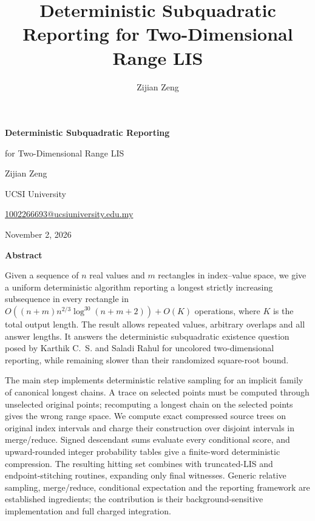 \documentclass[acmsmall,11pt,nonacm,natbib=false]{acmart}
\title[Deterministic Two-Dimensional Range LIS]{Deterministic Subquadratic Reporting for Two-Dimensional Range LIS}
\author{Zijian Zeng}
\affiliation{\institution{UCSI University}\country{Malaysia}}
\begin{document}
\pagestyle{research}
\begingroup\thispagestyle{empty}
\centering
\vspace*{0.7in}
{\LARGE\bfseries Deterministic Subquadratic Reporting\par
for Two-Dimensional Range LIS\par}
\vspace{0.35in}
{\large Zijian Zeng\par}
\vspace{0.1in}
UCSI University\par
\href{mailto:1002266693@ucsiuniversity.edu.my}{1002266693@ucsiuniversity.edu.my}\par
\vspace{0.2in}
November 2, 2026\par
\vspace{0.45in}
\begin{minipage}{\textwidth}
\begin{center}\textbf{Abstract}\end{center}
Given a sequence of $n$ real values and $m$ rectangles in index--value space,
we give a uniform deterministic algorithm reporting a longest strictly
increasing subsequence in every rectangle in
$O((n+m)n^{2/3}\log^{30}(n+m+2))+O(K)$ operations, where $K$ is the total
output length. The result allows repeated values, arbitrary overlaps and all
answer lengths. It answers the deterministic subquadratic existence question
posed by Karthik C.~S. and Saladi Rahul for uncolored two-dimensional reporting,
while remaining slower than their randomized square-root bound.

The main step implements deterministic relative sampling for an implicit
family of canonical longest chains. A trace on selected points must be
computed through unselected original points; recomputing a longest chain on
the selected points gives the wrong range space. We compute exact compressed
source trees on original index intervals and charge their construction over
disjoint intervals in merge/reduce. Signed descendant sums evaluate every
conditional score, and upward-rounded integer probability tables give a
finite-word deterministic compression. The resulting hitting set combines
with truncated-LIS and endpoint-stitching routines, expanding only final
witnesses. Generic relative sampling, merge/reduce, conditional expectation
and the reporting framework are established ingredients; the contribution
is their background-sensitive implementation and full charged integration.
\end{minipage}
\vfill
\par\endgroup\clearpage
\end{document}
